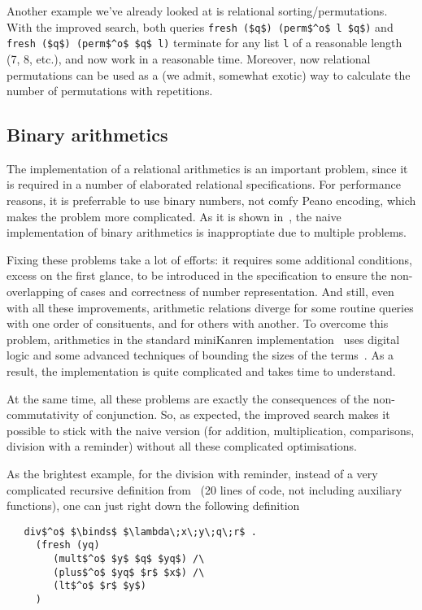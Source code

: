 Another example we've already looked at is relational sorting/permutations. 
With the improved search, both queries \lstinline|fresh ($q$) (perm$^o$ l $q$)| and 
\lstinline|fresh ($q$) (perm$^o$ $q$ l)| terminate for any list \lstinline|l| of a reasonable 
length (7, 8, etc.), and now work in a reasonable time. Moreover, now
relational permutations can be used as a (we admit, somewhat exotic) way to calculate 
the number of permutations with repetitions.

\subsection{Binary arithmetics}

The implementation of a relational arithmetics is an important problem, since it is required
in a number of elaborated relational specifications. For performance reasons, it is 
preferrable to use binary numbers, not comfy Peano encoding, which makes the problem 
more complicated. As it is shown in~\cite{WillThesis}, the naive implementation of 
binary arithmetics is inapproptiate due to multiple problems. 

Fixing these problems take a lot of efforts: it requires some additional conditions, 
excess on the first glance, to be introduced in the specification to ensure the non-overlapping 
of cases and correctness of number representation. And still, even with all these 
improvements, arithmetic relations diverge for some routine queries with one order of 
consituents, and for others with another. To overcome this problem, 
arithmetics in the standard miniKanren implementation~\cite{TRS} uses digital logic and 
some advanced techniques of bounding the sizes of the terms~\cite{KiselyovArithmetic}. 
As a result, the implementation is quite complicated and takes time to understand.

At the same time, all these problems are exactly the consequences of the non-commutativity 
of conjunction. So, as expected, the improved search makes it possible to stick with
the naive version (for addition, multiplication, comparisons, division with a reminder)
without all these complicated optimisations. 

As the brightest example, for the division with reminder, instead of a very complicated recursive definition 
from~\cite{TRS} (20 lines of code, not including auxiliary functions), one can just right down the 
following definition

\begin{lstlisting}
   div$^o$ $\binds$ $\lambda\;x\;y\;q\;r$ . 
     (fresh (yq)        
        (mult$^o$ $y$ $q$ $yq$) /\
        (plus$^o$ $yq$ $r$ $x$) /\
        (lt$^o$ $r$ $y$)
     )
\end{lstlisting}

